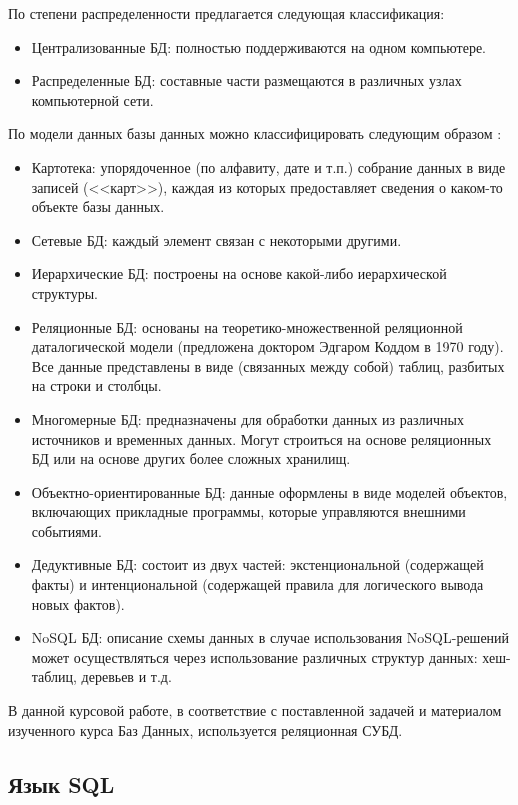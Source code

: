 По степени распределенности предлагается следующая классификация: 
\begin{itemize}
	\item Централизованные БД: полностью поддерживаются на одном компьютере.
	\item Распределенные БД: составные части размещаются в различных узлах компьютерной сети. 
\end{itemize}

По модели данных базы данных можно классифицировать следующим образом \cite{kulikov_db_workbook}:
\begin{itemize}
	\item Картотека: упорядоченное (по алфавиту, дате и т.п.) собрание данных в виде записей (<<карт>>), каждая из которых предоставляет сведения о каком-то объекте базы данных.
	\item Сетевые БД: каждый элемент связан с некоторыми другими.
	\item Иерархические БД: построены на основе какой-либо иерархической структуры. 
	\item Реляционные БД: основаны на теоретико-множественной реляционной даталогической модели (предложена доктором Эдгаром Коддом в 1970 году). Все данные представлены в виде (связанных между собой) таблиц, разбитых на строки и столбцы.
	\item Многомерные БД: предназначены для обработки данных из различных источников и временных данных. Могут строиться на основе реляционных БД или на основе других более сложных хранилищ.
	\item Объектно-ориентированные БД: данные оформлены в виде моделей объектов, включающих прикладные программы, которые управляются внешними событиями.
	\item Дедуктивные БД: состоит из двух частей: экстенциональной (содержащей факты) и интенциональной (содержащей правила для логического вывода новых фактов).
	\item NoSQL БД: описание схемы данных в случае использования NoSQL-решений может осуществляться через использование различных структур данных: хеш-таблиц, деревьев и т.д.
\end{itemize}

В данной курсовой работе, в соответствие с поставленной задачей и материалом изученного курса Баз Данных, используется реляционная СУБД.

\subsection{Язык SQL}

